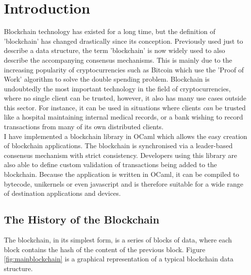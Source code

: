 \documentclass[12pt,a4paper,twoside,openright]{report}
\begin{document}
	\chapter{Introduction}
	Blockchain technology has existed for a long time, but the definition of 'blockchain' has changed drastically since its conception.
	Previously used just to describe a data structure, the term 'blockchain' is now widely used to also describe the accompanying consensus mechanisms.
	This is mainly due to the increasing popularity of cryptocurrencies such as Bitcoin \cite{Bitcoin} which use the 'Proof of Work' algorithm to solve the double spending problem.
	Blockchain is undoubtedly the most important technology in the field of cryptocurrencies, where no single client can be trusted, however, it also has many use cases outside this sector.
	For instance, it can be used in situations where clients \textit{can} be trusted like a hospital maintaining internal medical records, or a bank wishing to record transactions from many of its own distributed clients.\\
	
	I have implemented a blockchain library in OCaml which allows the easy creation of blockchain applications.
	The blockchain is synchronised via a leader-based consensus mechanism with strict consistency.
	Developers using this library are also able to define custom validation of transactions being added to the blockchain.
	Because the application is written in OCaml, it can be compiled to bytecode, unikernels or even javascript and is therefore suitable for a wide range of destination applications and devices.

	\section{The History of the Blockchain}
	The blockchain, in its simplest form, is a series of blocks of data, where each block contains the hash of the content of the previous block. 
	Figure \ref{fig:mainblockchain} is a graphical representation of a typical blockchain data structure.\\
\end{document}
